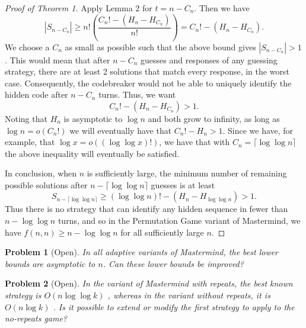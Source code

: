\documentclass[12pt, a4paper]{article}
\newtheorem{problem}{Problem}
\begin{document}
		 \begin{proof}[Proof of Theorem 1]
		 Apply Lemma 2 for $t = n-C_n$. Then we have
		 \begin{equation*}
		 |S_{n-C_{n}}|  \ge n!\left(\frac{C_{n}! - (H_n - H_{C_{n}})}{n!}\right)
		 = C_{n}! - (H_n-H_{C_{n}}).
		 \end{equation*}
		 We choose a $C_{n}$ as small as possible such that the above bound gives $|S_{n-C_n}| > 1$. This would mean that after $n-C_n$ guesses and responses of any guessing strategy, there are at least 2 solutions that match every response, in the worst case. Consequently, the codebreaker would not be able to uniquely identify the hidden code after $n-C_n$ turns. Thus, we want
		 \begin{equation*}
		 C_{n}! - (H_n - H_{C_{n}}) > 1.
		 \end{equation*}
		 Noting that $H_n$ is asymptotic to $\log n$ and both grow to infinity, as long as $\log n = o(C_n!)$ we will eventually have that $C_n!-H_n > 1$. Since we have, for example, that $\log x = o((\log \log x)!)$, we have that with $C_n = \lceil \log \log n \rceil$ the above inequality will eventually be satisfied.
		 
		 In conclusion, when $n$ is sufficiently large, the minimum number of remaining
		 possible solutions after $n - \lceil \log\log n \rceil$ guesses is at least
		 \begin{equation*}
		 S_{n - \lceil \log\log n \rceil} 
		 \ge (\log\log n)! - (H_n - H_{\log\log n})
		 > 1.
		 \end{equation*}
		 Thus there is no strategy that can identify any hidden sequence in fewer than $n-\log\log n$ turns, and so in the Permutation Game variant of Mastermind, we have $f(n, n)\ge n - \log\log n$ for all sufficiently large $n$.
		\end{proof}
		\begin{problem}[Open]
			In all adaptive variants of Mastermind, the best lower bounds are asymptotic to $n$. Can these lower bounds be improved?
		\end{problem}
		\begin{problem}[Open]
			In the variant of Mastermind with repeats, the best known strategy is $O(n\log\log k)$ \textnormal{\cite{DS13}}, whereas in the variant without repeats, it is $O(n \log k)$ \textnormal{\cite{OS13}}. Is it possible to extend or modify the first strategy to apply to the no-repeats game?
		\end{problem}
		 
\end{document}
